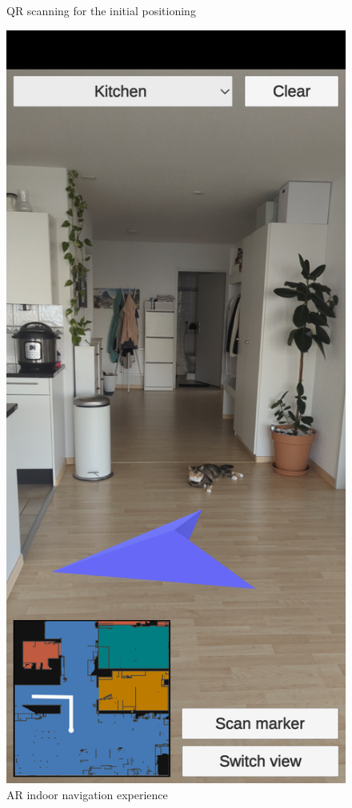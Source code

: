 \begin{figure}[!ht]
\begin{minipage}[b]{0.4\textwidth}
                \caption{QR scanning for the initial positioning}
                \label{3:fig:qr_scanning}
            \end{minipage}
            \hfill
            \begin{minipage}[b]{0.4\textwidth}
                \captionsetup{justification=centering}
                 \includegraphics[width=\textwidth]{figures/demos/ar_navigation.png}
                \caption{AR indoor navigation experience}
                \label{3:fig:ar_navigation}
            \end{minipage}
        \end{figure}
    
